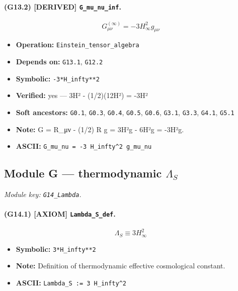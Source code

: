\documentclass[11pt,a4paper]{article}
\theoremstyle{remark}\newtheorem*{caution}{Caution}
\newcommand{\tagbox}[1]{\textsc{[#1]}}
\begin{document}
\paragraph{(G13.2) \tagbox{DERIVED} \texttt{G\_mu\_nu\_inf}.}
\begin{equation}
G^{(\infty)}_{\mu\nu}=-3 H_\infty^2 g_{\mu\nu}
\tag{G13.2}
\end{equation}
\begin{itemize}\setlength{\itemsep}{0.12em}
\item \textbf{Operation:} \texttt{Einstein\_tensor\_algebra}
\item \textbf{Depends on:} \texttt{G13.1}, \texttt{G12.2}
\item \textbf{Symbolic:} \texttt{-3*H\_infty**2}
\item \textbf{Verified:} yes --- 3H² - (1/2)(12H²) = -3H²
\item \textbf{Soft ancestors:} \texttt{G0.1}, \texttt{G0.3}, \texttt{G0.4}, \texttt{G0.5}, \texttt{G0.6}, \texttt{G3.1}, \texttt{G3.3}, \texttt{G4.1}, \texttt{G5.1}
\item \textbf{Note:} G = R\_μν - (1/2) R g = 3H²g - 6H²g = -3H²g.
\item \textbf{ASCII:} \texttt{G\_mu\_nu = -3 H\_infty^2 g\_mu\_nu}
\end{itemize}
\subsection{Module G --- thermodynamic $\Lambda_S$}
\textit{Module key: \texttt{G14\_Lambda}.}
\paragraph{(G14.1) \tagbox{AXIOM} \texttt{Lambda\_S\_def}.}
\begin{equation}
\Lambda_S\equiv 3 H_\infty^2
\tag{G14.1}
\end{equation}
\begin{itemize}\setlength{\itemsep}{0.12em}
\item \textbf{Symbolic:} \texttt{3*H\_infty**2}
\item \textbf{Note:} Definition of thermodynamic effective cosmological constant.
\item \textbf{ASCII:} \texttt{Lambda\_S := 3 H\_infty^2}
\end{itemize}
\end{document}
